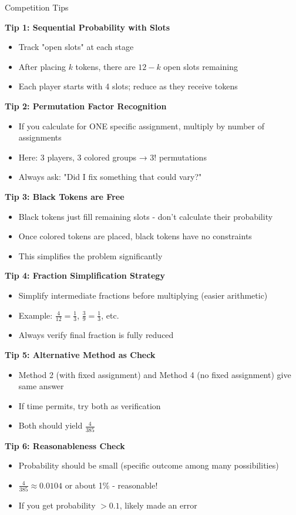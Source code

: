 \documentclass[12pt]{article}
\begin{document}
\begin{protipbox}{Competition Tips}

\textbf{Tip 1: Sequential Probability with Slots}
\begin{itemize}
    \item Track "open slots" at each stage
    \item After placing $k$ tokens, there are $12 - k$ open slots remaining
    \item Each player starts with 4 slots; reduce as they receive tokens
\end{itemize}

\textbf{Tip 2: Permutation Factor Recognition}
\begin{itemize}
    \item If you calculate for ONE specific assignment, multiply by number of assignments
    \item Here: 3 players, 3 colored groups → $3!$ permutations
    \item Always ask: "Did I fix something that could vary?"
\end{itemize}

\textbf{Tip 3: Black Tokens are Free}
\begin{itemize}
    \item Black tokens just fill remaining slots - don't calculate their probability
    \item Once colored tokens are placed, black tokens have no constraints
    \item This simplifies the problem significantly
\end{itemize}

\textbf{Tip 4: Fraction Simplification Strategy}
\begin{itemize}
    \item Simplify intermediate fractions before multiplying (easier arithmetic)
    \item Example: $\frac{4}{12} = \frac{1}{3}$, $\frac{3}{9} = \frac{1}{3}$, etc.
    \item Always verify final fraction is fully reduced
\end{itemize}

\textbf{Tip 5: Alternative Method as Check}
\begin{itemize}
    \item Method 2 (with fixed assignment) and Method 4 (no fixed assignment) give same answer
    \item If time permits, try both as verification
    \item Both should yield $\frac{4}{385}$
\end{itemize}

\textbf{Tip 6: Reasonableness Check}
\begin{itemize}
    \item Probability should be small (specific outcome among many possibilities)
    \item $\frac{4}{385} \approx 0.0104$ or about 1\% - reasonable!
    \item If you get probability $> 0.1$, likely made an error
\end{itemize}

\end{protipbox}
\end{document}
